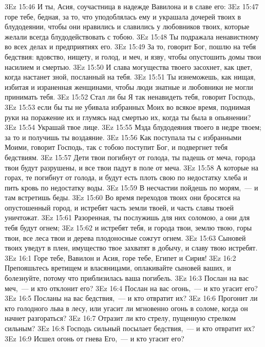 \vs 3Ez 15:46 И ты, Асия, соучастница в надежде Вавилона и в славе его:
\vs 3Ez 15:47 горе тебе, бедная, за то, что уподоблялась ему и украшала дочерей твоих в блудодеянии, чтобы они нравились и славились у любовников твоих, которые желали всегда блудодействовать с тобою.
\vs 3Ez 15:48 Ты подражала ненавистному во всех делах и предприятиях его.
\vs 3Ez 15:49 За то, говорит Бог, пошлю на тебя бедствия: вдовство, нищету, и голод, и меч, и язву, чтобы опустошить домы твои насилием и смертью.
\vs 3Ez 15:50 И слава могущества твоего засохнет, как цвет, когда настанет зной, посланный на тебя.
\vs 3Ez 15:51 Ты изнеможешь, как нищая, избитая и израненная женщинами, чтобы люди знатные и любовники не могли принимать тебя.
\vs 3Ez 15:52 Стал ли бы Я так ненавидеть тебя, говорит Господь,
\vs 3Ez 15:53 если бы ты не убивала избранных Моих во всякое время, поднимая руки на поражение их и глумясь над смертью их, когда ты была в опьянении?
\vs 3Ez 15:54 Украшай твое лице.
\vs 3Ez 15:55 Мзда блудодеяния твоего в недре твоем; за то и получишь ты воздаяние.
\vs 3Ez 15:56 Как поступала ты с избранными Моими, говорит Господь, так с тобою поступит Бог, и подвергнет тебя бедствиям.
\vs 3Ez 15:57 Дети твои погибнут от голода, ты падешь от меча, города твои будут разрушены, и все твои падут в поле от меча.
\vs 3Ez 15:58 А которые на горах, те погибнут от голода, и будут есть плоть свою по недостатку хлеба и пить кровь по недостатку воды.
\vs 3Ez 15:59 В несчастии пойдешь по морям,~--- и там встретишь беды.
\vs 3Ez 15:60 Во время переходов твоих они бросятся на опустошенный город, и истребят часть земли твоей, и часть славы твоей уничтожат.
\vs 3Ez 15:61 Разоренная, ты послужишь для них соломою, а они для тебя будут огнем;
\vs 3Ez 15:62 и истребят тебя, и города твои, землю твою, горы твои, все леса твои и дерева плодоносные сожгут огнем.
\vs 3Ez 15:63 Сыновей твоих уведут в плен, имущество твое захватят в добычу, и славу твою истребят.
\vs 3Ez 16:1 Горе тебе, Вавилон и Асия, горе тебе, Египет и Сирия!
\vs 3Ez 16:2 Препояшьтесь вретищем и власяницами, оплакивайте сыновей ваших, и болезнуйте, потому что приблизилась ваша погибель.
\vs 3Ez 16:3 Послан на вас меч,~--- и кто отклонит его?
\vs 3Ez 16:4 Послан на вас огонь,~--- и кто угасит его?
\vs 3Ez 16:5 Посланы на вас бедствия,~--- и кто отвратит их?
\vs 3Ez 16:6 Прогонит ли кто голодного льва в лесу, или угасит ли мгновенно огонь в соломе, когда он начнет разгораться?
\vs 3Ez 16:7 Отразит ли кто стрелу, пущенную стрелком сильным?
\vs 3Ez 16:8 Господь сильный посылает бедствия,~--- и кто отвратит их?
\vs 3Ez 16:9 Исшел огонь от гнева Его,~--- и кто угасит его?
